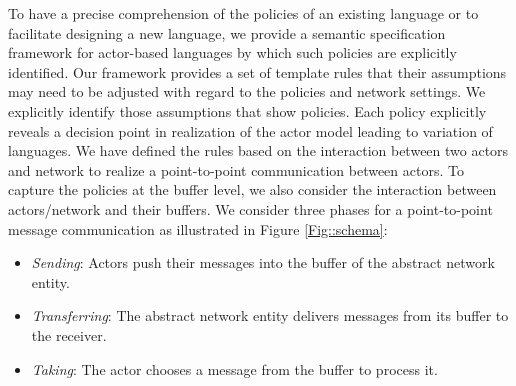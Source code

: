 To have a precise comprehension of the policies of an existing language or to facilitate designing a new language, we provide a semantic specification framework for actor-based languages by which such policies are %
explicitly identified. Our framework provides a set of template rules that their assumptions may need to be adjusted with regard to the policies and network settings. We explicitly identify those assumptions that show policies. Each policy explicitly reveals a decision point in realization of the actor model leading to variation of languages. We have defined the rules based on the interaction between two actors and network to realize a point-to-point communication between actors. To capture the policies at the buffer level, we also consider the interaction between actors/network and their buffers. We consider three phases for a point-to-point message communication as illustrated in Figure \ref{Fig::schema}: 
\begin{itemize}
\item\textit{Sending}: Actors push their messages into the buffer of the abstract network entity. %

\item\textit{Transferring}: The abstract network entity delivers messages from its buffer to the receiver. %


\item\textit{Taking}: The actor chooses a message from the buffer to process it. %
	
\end{itemize}

